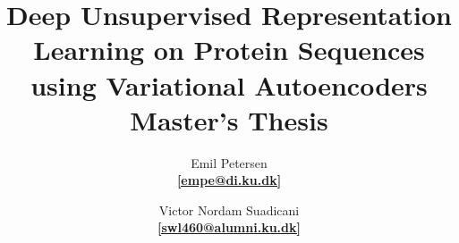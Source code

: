 \title{
    \Huge{\textbf{Deep Unsupervised Representation Learning on Protein Sequences using Variational Autoencoders}} \\
    \vspace{1cm}
    \Large{Master's Thesis}
}

\author{\Large{Emil Petersen} \\ \href{mailto:empe@di.ku.dk}{\textbf{[empe@di.ku.dk]}} \and \Large{Victor Nordam Suadicani} \\ \href{mailto:nordam@di.ku.dk}{\textbf{[swl460@alumni.ku.dk]}}
}




\maketitle

\thispagestyle{empty}

\newpage
\setcounter{page}{1}
